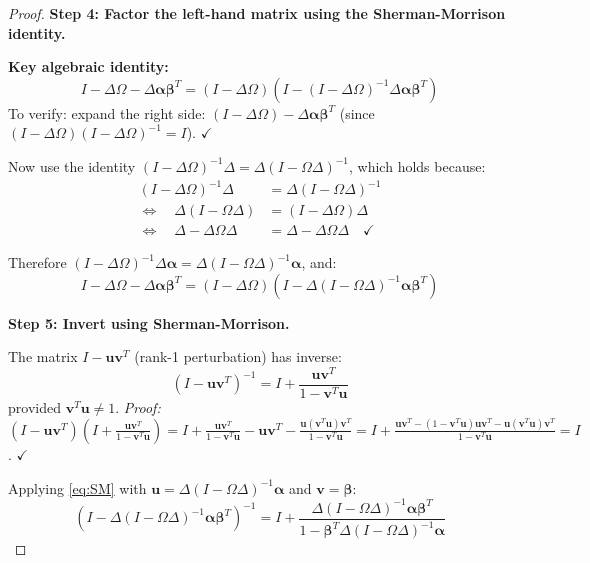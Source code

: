 \documentclass[12pt]{article}
\begin{document}
\begin{proof}
\medskip
\textbf{Step 4: Factor the left-hand matrix using the Sherman-Morrison identity.}

\textbf{Key algebraic identity:}
\begin{equation}
    I - \Delta\Omega - \Delta\bm{\alpha}\bm{\beta}^T = (I - \Delta\Omega)\left(I - (I-\Delta\Omega)^{-1}\Delta\bm{\alpha}\bm{\beta}^T\right)
    \label{eq:factor}
\end{equation}
To verify: expand the right side: $(I-\Delta\Omega) - \Delta\bm{\alpha}\bm{\beta}^T$ (since $(I-\Delta\Omega)(I-\Delta\Omega)^{-1} = I$). $\checkmark$

Now use the identity $(I-\Delta\Omega)^{-1}\Delta = \Delta(I-\Omega\Delta)^{-1}$, which holds because:
\begin{align}
    (I-\Delta\Omega)^{-1}\Delta &= \Delta(I-\Omega\Delta)^{-1} \\
    \Leftrightarrow \quad \Delta(I-\Omega\Delta) &= (I-\Delta\Omega)\Delta \\
    \Leftrightarrow \quad \Delta - \Delta\Omega\Delta &= \Delta - \Delta\Omega\Delta \quad \checkmark
\end{align}

Therefore $(I-\Delta\Omega)^{-1}\Delta\bm{\alpha} = \Delta(I-\Omega\Delta)^{-1}\bm{\alpha}$, and:
\begin{equation}
    I - \Delta\Omega - \Delta\bm{\alpha}\bm{\beta}^T = (I-\Delta\Omega)\left(I - \Delta(I-\Omega\Delta)^{-1}\bm{\alpha}\bm{\beta}^T\right)
    \label{eq:factor2}
\end{equation}

\medskip
\textbf{Step 5: Invert using Sherman-Morrison.}

The matrix $I - \mathbf{u}\mathbf{v}^T$ (rank-1 perturbation) has inverse:
\begin{equation}
    (I - \mathbf{u}\mathbf{v}^T)^{-1} = I + \frac{\mathbf{u}\mathbf{v}^T}{1 - \mathbf{v}^T\mathbf{u}}
    \label{eq:SM}
\end{equation}
provided $\mathbf{v}^T\mathbf{u} \neq 1$. \textit{Proof:} $(I - \mathbf{u}\mathbf{v}^T)(I + \frac{\mathbf{u}\mathbf{v}^T}{1-\mathbf{v}^T\mathbf{u}}) = I + \frac{\mathbf{u}\mathbf{v}^T}{1-\mathbf{v}^T\mathbf{u}} - \mathbf{u}\mathbf{v}^T - \frac{\mathbf{u}(\mathbf{v}^T\mathbf{u})\mathbf{v}^T}{1-\mathbf{v}^T\mathbf{u}} = I + \frac{\mathbf{u}\mathbf{v}^T - (1-\mathbf{v}^T\mathbf{u})\mathbf{u}\mathbf{v}^T - \mathbf{u}(\mathbf{v}^T\mathbf{u})\mathbf{v}^T}{1-\mathbf{v}^T\mathbf{u}} = I$. $\checkmark$

Applying \eqref{eq:SM} with $\mathbf{u} = \Delta(I-\Omega\Delta)^{-1}\bm{\alpha}$ and $\mathbf{v} = \bm{\beta}$:
\begin{equation}
    \left(I - \Delta(I-\Omega\Delta)^{-1}\bm{\alpha}\bm{\beta}^T\right)^{-1} = I + \frac{\Delta(I-\Omega\Delta)^{-1}\bm{\alpha}\bm{\beta}^T}{1 - \bm{\beta}^T\Delta(I-\Omega\Delta)^{-1}\bm{\alpha}}
    \label{eq:SMapp}
\end{equation}


\end{proof}
\end{document}
